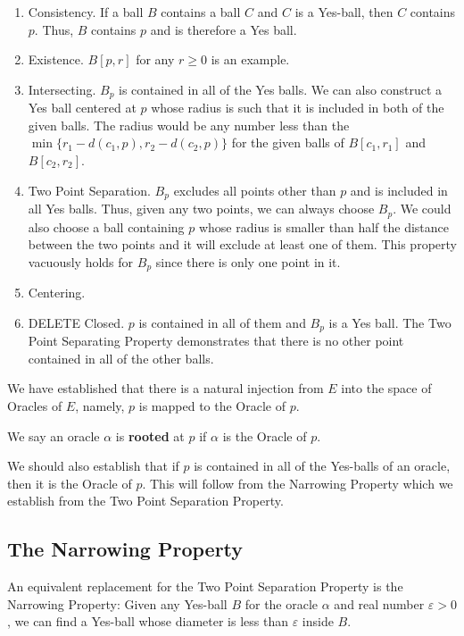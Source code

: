\documentclass[12pt]{article}
\begin{document}
\begin{enumerate}
    \item Consistency. If a ball $B$ contains a ball $C$ and $C$ is a Yes-ball, then $C$ contains $p$. Thus, $B$ contains $p$ and is therefore a Yes ball. 
    \item Existence. $B[p, r]$ for any $r \geq 0$ is an example. 
    \item Intersecting. $B_p$ is contained in all of the Yes balls. We can also construct a Yes ball centered at $p$ whose radius is such that it is included in both of the given balls. The radius would be any number less than the $\min\{r_1 - d(c_1, p), r_2 - d(c_2, p)\}$ for the given balls of $B[c_1, r_1]$ and $B[c_2, r_2]$. 
    \item Two Point Separation. $B_p$ excludes all points other than $p$ and is included in all Yes balls. Thus, given any two points, we can always choose $B_p$. We could also choose a ball containing $p$ whose radius is smaller than half the distance between the two points and it will exclude at least one of them. This property vacuously holds for $B_p$ since there is only one point in it.
    \item Centering. 
    
    \item DELETE Closed. $p$ is contained in all of them and $B_p$ is a Yes ball. The Two Point Separating Property demonstrates that there is no other point contained in all of the other balls. 
\end{enumerate}

We have established that there is a natural injection from $E$ into the space of Oracles of $E$, namely, $p$ is mapped to the Oracle of $p$. 

We say an oracle $\alpha$ is \textbf{rooted} at $p$ if $\alpha$ is the Oracle of $p$. 

We should also establish that if $p$ is contained in all of the Yes-balls of an oracle, then it is the Oracle of $p$. This will follow from the Narrowing Property which we establish from the Two Point Separation Property. 


\subsection{The Narrowing Property}

An equivalent replacement for the Two Point Separation Property is the Narrowing Property: Given any Yes-ball $B$ for the oracle $\alpha$ and real number $\varepsilon >0$, we can find a Yes-ball whose diameter is less than $\varepsilon$ inside $B$.
\end{document}
